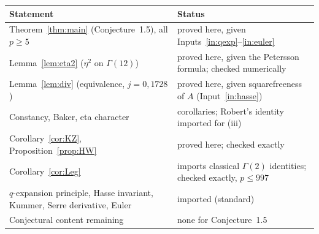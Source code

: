 \documentclass[11pt,a4paper]{article}
\numberwithin{equation}{section}
\theoremstyle{definition}
\theoremstyle{remark}
\begin{document}
\begin{center}
\small
\begin{tabular}{p{}p{}}
\toprule
Statement & Status\\\midrule
Theorem~\ref{thm:main} (Conjecture~1.5), all $p\ge5$ & proved here, given Inputs~\ref{in:qexp}--\ref{in:euler}\\
Lemma~\ref{lem:eta2} ($\eta^2$ on $\Gamma(12)$) & proved here, given the Petersson formula; checked numerically\\
Lemma~\ref{lem:div} (equivalence, $j=0,1728$) & proved here, given squarefreeness of $A$ (Input~\ref{in:hasse})\\
Constancy, Baker, eta character & corollaries; Robert's identity imported for (iii)\\
Corollary~\ref{cor:KZ}, Proposition~\ref{prop:HW} & proved here; checked exactly\\
Corollary~\ref{cor:Leg} & imports classical $\Gamma(2)$ identities; checked exactly, $p\le997$\\
$q$-expansion principle, Hasse invariant, Kummer, Serre derivative, Euler & imported (standard)\\
Conjectural content remaining & none for Conjecture~1.5\\
\bottomrule
\end{tabular}
\end{center}
\end{document}
